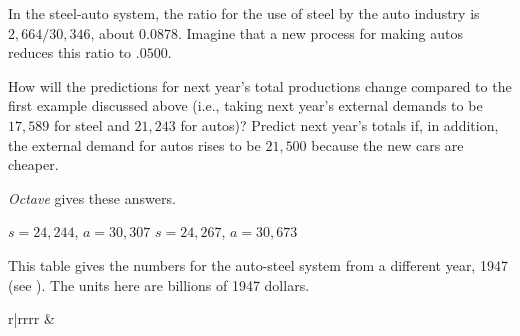 \begin{exercises}
  \item 
    In the steel-auto system, the ratio for the use of steel by the auto
    industry is $2,664/30,346$, about $0.0878$.
    Imagine that a new process for making autos reduces this 
    ratio to $.0500$.
    \begin{exparts}
      \partsitem How will the predictions for next year's total
        productions change compared to the first example discussed
        above (i.e., taking next year's external demands to be
        $17,589$ for steel and $21,243$ for autos)?
      \partsitem Predict next year's totals if, in addition,
        the external demand for
        autos rises to be $21,500$ because the new cars are cheaper.
    \end{exparts}
    \begin{answer}
      \textit{Octave} gives these answers.
      \begin{exparts}
        \partsitem $s=24,244$, $a=30,307$
        \partsitem $s=24,267$, $a=30,673$
      \end{exparts}
    \end{answer}
  \item 
    This table gives the numbers for the auto-steel system from
    a different year, 1947 (see \cite{Leontief1951}).
    The units here are billions of 1947 dollars.
    \begin{center}
      \begin{tabular}{r|rrrr}
             &
\end{tabular}
\end{center}
\end{exercises}
